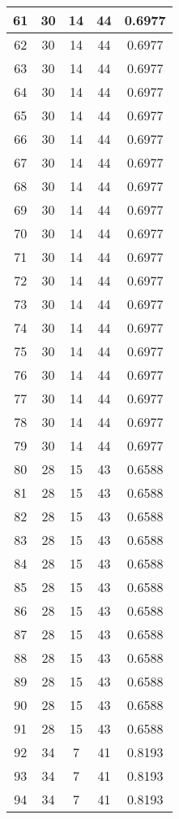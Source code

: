 \documentclass[letterpaper, 12pt]{article}
\begin{document}
\begin{longtable}{|c|c|c|c|c|}
\hline
61 & 30 & 14 & 44 & 0.6977 \\
\hline
62 & 30 & 14 & 44 & 0.6977 \\
\hline
63 & 30 & 14 & 44 & 0.6977 \\
\hline
64 & 30 & 14 & 44 & 0.6977 \\
\hline
65 & 30 & 14 & 44 & 0.6977 \\
\hline
66 & 30 & 14 & 44 & 0.6977 \\
\hline
67 & 30 & 14 & 44 & 0.6977 \\
\hline
68 & 30 & 14 & 44 & 0.6977 \\
\hline
69 & 30 & 14 & 44 & 0.6977 \\
\hline
70 & 30 & 14 & 44 & 0.6977 \\
\hline
71 & 30 & 14 & 44 & 0.6977 \\
\hline
72 & 30 & 14 & 44 & 0.6977 \\
\hline
73 & 30 & 14 & 44 & 0.6977 \\
\hline
74 & 30 & 14 & 44 & 0.6977 \\
\hline
75 & 30 & 14 & 44 & 0.6977 \\
\hline
76 & 30 & 14 & 44 & 0.6977 \\
\hline
77 & 30 & 14 & 44 & 0.6977 \\
\hline
78 & 30 & 14 & 44 & 0.6977 \\
\hline
79 & 30 & 14 & 44 & 0.6977 \\
\hline
80 & 28 & 15 & 43 & 0.6588 \\
\hline
81 & 28 & 15 & 43 & 0.6588 \\
\hline
82 & 28 & 15 & 43 & 0.6588 \\
\hline
83 & 28 & 15 & 43 & 0.6588 \\
\hline
84 & 28 & 15 & 43 & 0.6588 \\
\hline
85 & 28 & 15 & 43 & 0.6588 \\
\hline
86 & 28 & 15 & 43 & 0.6588 \\
\hline
87 & 28 & 15 & 43 & 0.6588 \\
\hline
88 & 28 & 15 & 43 & 0.6588 \\
\hline
89 & 28 & 15 & 43 & 0.6588 \\
\hline
90 & 28 & 15 & 43 & 0.6588 \\
\hline
91 & 28 & 15 & 43 & 0.6588 \\
\hline
92 & 34 & 7 & 41 & 0.8193 \\
\hline
93 & 34 & 7 & 41 & 0.8193 \\
\hline
94 & 34 & 7 & 41 & 0.8193 \\

\end{longtable}
\end{document}
